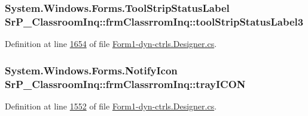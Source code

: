 \hypertarget{class_sr_p___classroom_inq_1_1frm_classrrom_inq_a24d465fc0b54799fb86003278ae1e0c7}{
\subsubsection[{tool\-Strip\-Status\-Label3}]{\setlength{\rightskip}{0pt plus 5cm}\-System.\-Windows.\-Forms.\-Tool\-Strip\-Status\-Label {\bf \-Sr\-P\-\_\-\-Classroom\-Inq\-::frm\-Classrrom\-Inq\-::tool\-Strip\-Status\-Label3}}}
\label{class_sr_p___classroom_inq_1_1frm_classrrom_inq_a24d465fc0b54799fb86003278ae1e0c7}


\-Definition at line \hyperlink{_form1-dyn-ctrls_8_designer_8cs_source_l01654}{1654} of file \hyperlink{_form1-dyn-ctrls_8_designer_8cs_source}{\-Form1-\/dyn-\/ctrls.\-Designer.\-cs}.

\hypertarget{class_sr_p___classroom_inq_1_1frm_classrrom_inq_a8c062d5fe665631b364688c76e36e7f7}{
\subsubsection[{tray\-I\-C\-O\-N}]{\setlength{\rightskip}{0pt plus 5cm}\-System.\-Windows.\-Forms.\-Notify\-Icon {\bf \-Sr\-P\-\_\-\-Classroom\-Inq\-::frm\-Classrrom\-Inq\-::tray\-I\-C\-O\-N}}}
\label{class_sr_p___classroom_inq_1_1frm_classrrom_inq_a8c062d5fe665631b364688c76e36e7f7}


\-Definition at line \hyperlink{_form1-dyn-ctrls_8_designer_8cs_source_l01552}{1552} of file \hyperlink{_form1-dyn-ctrls_8_designer_8cs_source}{\-Form1-\/dyn-\/ctrls.\-Designer.\-cs}.

